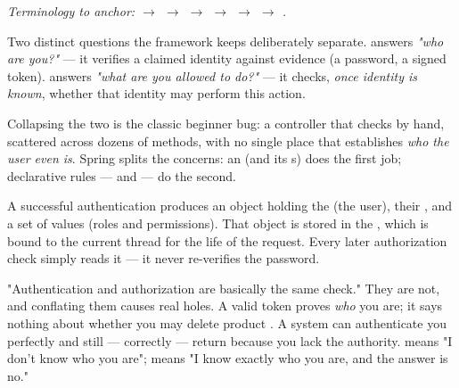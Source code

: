 \begin{center}\small\itshape\color{cInk!70}
Terminology to anchor:  $\rightarrow$  $\rightarrow$  $\rightarrow$  $\rightarrow$  $\rightarrow$  $\rightarrow$ .
\end{center}



 Two distinct questions the framework keeps deliberately separate.  answers \emph{"who are you?"} --- it verifies a claimed identity against evidence (a password, a signed token).  answers \emph{"what are you allowed to do?"} --- it checks, \emph{once identity is known}, whether that identity may perform this action.

 Collapsing the two is the classic beginner bug: a controller that checks  by hand, scattered across dozens of methods, with no single place that establishes \emph{who the user even is}. Spring splits the concerns: an  (and its s) does the first job; declarative rules ---  and  --- do the second.

 A successful authentication produces an  object holding the  (the user), their , and a set of  values (roles and permissions). That object is stored in the , which is bound to the current thread for the life of the request. Every later authorization check simply reads it --- it never re-verifies the password.

\begin{misconception}
"Authentication and authorization are basically the same check." They are not, and conflating them causes real holes. A valid token proves \emph{who} you are; it says nothing about whether you may delete product . A system can authenticate you perfectly and still --- correctly --- return  because you lack the authority.  means "I don't know who you are";  means "I know exactly who you are, and the answer is no."
\end{misconception}

